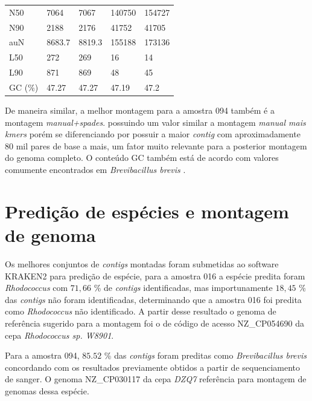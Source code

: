 \begin{table}[htb]
{\begin{tabular}{lllll}
        N50                                          & 7064    & 7067    & 140750  & 154727  \\
        N90                                          & 2188    & 2176    & 41752   & 41705   \\
        auN                                          & 8683.7  & 8819.3  & 155188  & 173136  \\
        L50                                          & 272     & 269     & 16      & 14      \\
        L90                                          & 871     & 869     & 48      & 45      \\
        GC (\%)                                      & 47.27   & 47.27   & 47.19   & 47.2   \\
	\bottomrule
    \end{tabular}
	}{%
	\centering
	  }
\end{table}




De maneira similar, a melhor montagem para a amostra 094 também é a montagem \textit{manual+spades}.
possuindo um valor similar a montagem \textit{manual mais kmers} porém se diferenciando por possuir a maior \textit{contig}
com aproximadamente 80 mil pares de base a mais, um fator muito relevante para a posterior montagem do genoma completo.
O conteúdo GC também está de acordo com valores comumente encontrados em \textit{Brevibacillus brevis} \cite{nakamura1991bacillus}.

\section{Predição de espécies e montagem de genoma}

Os melhores conjuntos de \textit{contigs} montadas foram submetidas ao software KRAKEN2 para predição de espécie,
para a amostra 016 a espécie predita foram \textit{Rhodococcus} com $71,66$ \% de \textit{contigs} identificadas, mas importunamente
$18,45$ \% das \textit{contigs} não foram identificadas, determinando que a amostra 016 foi predita como \textit{Rhodococcus}
não identificado. A partir desse resultado o genoma de referência sugerido para a montagem foi o de código
de acesso NZ\_CP054690 da cepa \textit{Rhodococcus sp. W8901}. 

Para a amostra 094, $85.52$ \% das \textit{contigs} foram preditas como \textit{Brevibacillus brevis}
concordando com os resultados previamente obtidos a partir de sequenciamento de sanger. O genoma NZ\_CP030117
da cepa \textit{DZQ7} referência para montagem de genomas dessa espécie.

